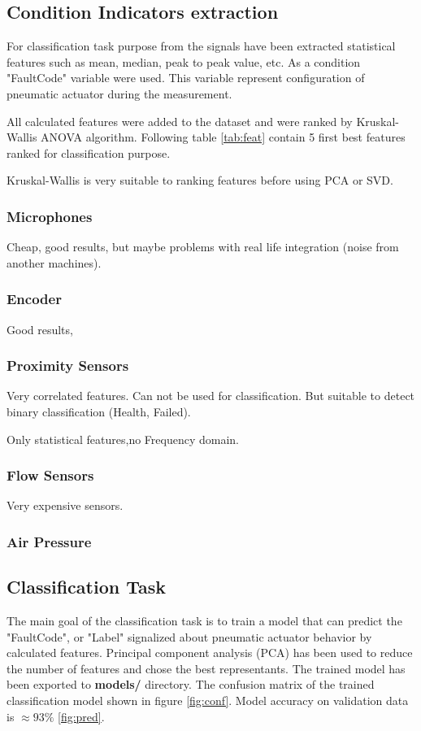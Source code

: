 \documentclass[class=article, crop=false]{standalone}
\begin{document}
\subsection{Condition Indicators extraction}

For classification task purpose from the signals have been extracted
statistical features such as mean, median, peak to peak value, etc.
As a condition "FaultCode" variable
were used. This variable represent configuration of pneumatic actuator
during the measurement.

All calculated features were added to the dataset and were ranked by
Kruskal-Wallis ANOVA algorithm. Following table \ref{tab:feat} contain
5 first best features ranked for classification purpose.

Kruskal-Wallis is very suitable to ranking features before using PCA or
SVD.

\subsubsection{Microphones}
Cheap, good results, but maybe problems with real life integration (noise
from another machines).
\subsubsection{Encoder}
Good results, 
\subsubsection{Proximity Sensors}
Very correlated features. Can not be used for classification. But suitable
to detect binary classification (Health, Failed).

Only statistical features,no Frequency domain.

\subsubsection{Flow Sensors}
Very expensive sensors. 

\subsubsection{Air Pressure}


\subsection{Classification Task}

The main goal of the classification task is to train a model that can
predict the "FaultCode", or "Label" signalized about pneumatic actuator behavior by
calculated features.
Principal component analysis (PCA) has been used to reduce the number of
features and chose the best representants.
The trained model has been exported to
\textbf{models/} directory.
The confusion matrix of the trained classification model shown in figure
\ref{fig:conf}. Model accuracy on validation data is $\approx 93 \%$
\ref{fig:pred}.
\end{document}
